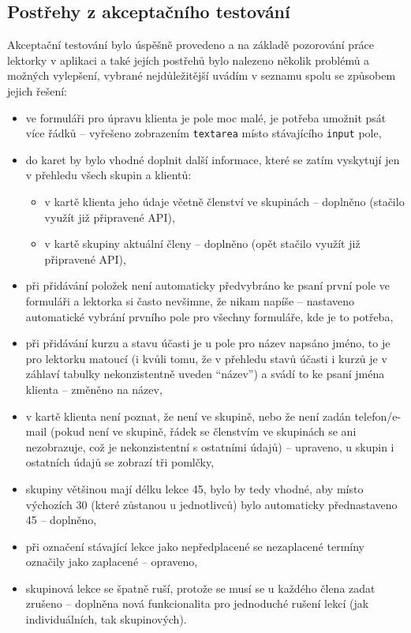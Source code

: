         \subsection{Postřehy z akceptačního testování}
        Akceptační testování bylo úspěšně provedeno a na základě pozorování práce lektorky v aplikaci a také jejích postřehů bylo nalezeno několik problémů a možných vylepšení, vybrané nejdůležitější uvádím v seznamu spolu se způsobem jejich řešení:
            \begin{itemize}
                \item ve formuláři pro úpravu klienta je pole moc malé, je potřeba umožnit psát více řádků -- vyřešeno zobrazením \verb|textarea| místo stávajícího \verb|input| pole,
                \item do karet by bylo vhodné doplnit další informace, které se zatím vyskytují jen v přehledu všech skupin a klientů:
                \begin{itemize}
                    \item v kartě klienta jeho údaje včetně členství ve skupinách -- doplněno (stačilo využít již připravené API),
                    \item v kartě skupiny aktuální členy -- doplněno (opět stačilo využít již připravené API),
                \end{itemize} 
                \item při přidávání položek není automaticky předvybráno ke psaní první pole ve formuláři a lektorka si často nevšimne, že nikam napíše -- nastaveno automatické vybrání prvního pole pro všechny formuláře, kde je to potřeba,
                \item při přidávání kurzu a stavu účasti je u pole pro název napsáno jméno, to je pro lektorku matoucí (i kvůli tomu, že v přehledu stavů účasti i kurzů je v záhlaví tabulky nekonzistentně uveden \enquote{název}) a svádí to ke psaní jména klienta -- změněno na název,
                \item v kartě klienta není poznat, že není ve skupině, nebo že není zadán telefon/e-mail (pokud není ve skupině, řádek se členstvím ve skupinách se ani nezobrazuje, což je nekonzistentní s ostatními údajů) -- upraveno, u skupin i ostatních údajů se zobrazí tři pomlčky,
                \item skupiny většinou mají délku lekce 45, bylo by tedy vhodné, aby místo výchozích 30 (které zůstanou u jednotlivců) bylo automaticky přednastaveno 45 -- doplněno,
                \item při označení stávající lekce jako nepředplacené se nezaplacené termíny označily jako zaplacené -- opraveno,
                \item skupinová lekce se špatně ruší, protože se musí se u každého člena zadat zrušeno -- doplněna nová funkcionalita pro jednoduché rušení lekcí (jak individuálních, tak skupinových).
            \end{itemize}
        
